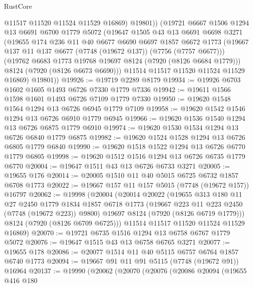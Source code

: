 \begin{lexlean}{RustCore}
\begin{coremodule}
            @11517
            @11520
            @11524
            @11529
            @16869)
          @19801))
      (@19721
        @6667
        @1506
        @1294
        @13
        @6691
        @6700
        @1779
        @5072
        (@19647
          @1505
          @43
          @13
          @6691
          @6698
          @3271
          (@19655
            @174
            @236
            @11
            @40
            @6677
            @6690
            @6697
            @1857
            @6672
            @1773
            (@19667 @137 @11 @137 @6677 (@7748 (@19672 @137)) (@7756 (@7757 @6677)))
            (@19762 @6683 @1773 @19768 @19697 @8124 (@7920 (@8126 @6684 @1779)))
            @8124
            (@7920 (@8126 @6673 @6690)))
          @11514
          @11517
          @11520
          @11524
          @11529
          @16869)
        @19801))
@19926 := @19719 @2289 @8179
@19934 := @19926 @6703 @1602 @1605 @1493 @6726 @7330 @1779 @7336
@19942 := @19611 @1566 @1598 @1601 @1493 @6726 @7109 @1779 @7330
@19950 := @19620 @1548 @1564 @1294 @13 @6726 @6945 @1779 @7109
@19958 := @19620 @1542 @1546 @1294 @13 @6726 @6910 @1779 @6945
@19966 := @19620 @1536 @1540 @1294 @13 @6726 @6875 @1779 @6910
@19974 := @19620 @1530 @1534 @1294 @13 @6726 @6840 @1779 @6875
@19982 := @19620 @1524 @1528 @1294 @13 @6726 @6805 @1779 @6840
@19990 := @19620 @1518 @1522 @1294 @13 @6726 @6770 @1779 @6805
@19998 := @19620 @1512 @1516 @1294 @13 @6726 @6735 @1779 @6770
@20004 := @19647 @1511 @43 @13 @6726 @6733 @3271
@20005 := @19655 @176
@20014 := @20005 @1510 @11 @40 @5015 @6725 @6732 @1857 @6708 @1773
@20022 := @19667 @157 @11 @157 @5015 (@7748 (@19672 @157)) @16797
@20062 := @19998
    (@20004
      (@20014
        @20022
        (@19655
          @313
          @180
          @11
          @27
          @2450
          @1779
          @1834
          @1857
          @6718
          @1773
          (@19667 @223 @11 @223 @2450 (@7748 (@19672 @223)) @9800)
          @19697
          @8124
          (@7920 (@8126 @6719 @1779)))
        @8124
        (@7920 (@8126 @6709 @6725)))
      @11514
      @11517
      @11520
      @11524
      @11529
      @16869)
@20070 := @19721 @6735 @1516 @1294 @13 @6758 @6767 @1779 @5072
@20076 := @19647 @1515 @43 @13 @6758 @6765 @3271
@20077 := @19655 @178
@20086 := @20077 @1514 @11 @40 @5115 @6757 @6764 @1857 @6740 @1773
@20094 := @19667 @91 @11 @91 @5115 (@7748 (@19672 @91)) @16964
@20137 := @19990
    (@20062
      (@20070
        (@20076
          (@20086
            @20094
            (@19655
              @416
              @180

\end{coremodule}
\end{lexlean}
